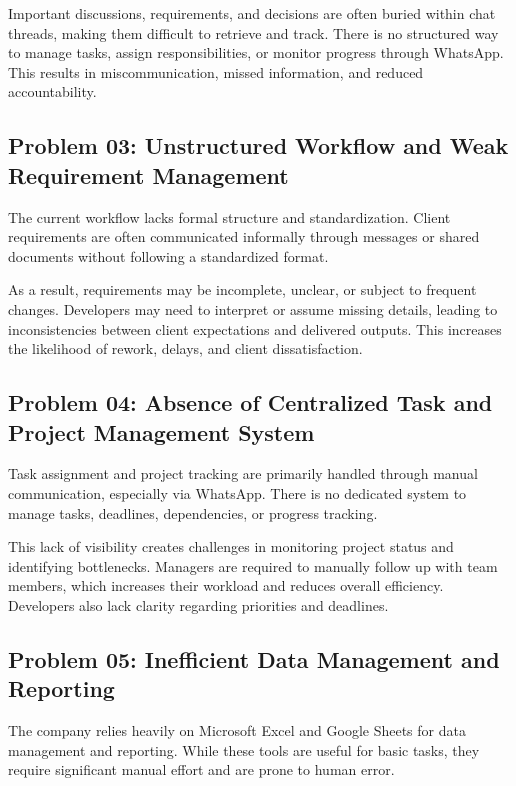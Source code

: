 \documentclass[12pt,a4paper]{report}
\begin{document}
Important discussions, requirements, and decisions are often buried within chat threads, making them difficult to retrieve and track. There is no structured way to manage tasks, assign responsibilities, or monitor progress through WhatsApp. This results in miscommunication, missed information, and reduced accountability.

\subsection{Problem 03: Unstructured Workflow and Weak Requirement Management}

The current workflow lacks formal structure and standardization. Client requirements are often communicated informally through messages or shared documents without following a standardized format.

As a result, requirements may be incomplete, unclear, or subject to frequent changes. Developers may need to interpret or assume missing details, leading to inconsistencies between client expectations and delivered outputs. This increases the likelihood of rework, delays, and client dissatisfaction.

\subsection{Problem 04: Absence of Centralized Task and Project Management System}

Task assignment and project tracking are primarily handled through manual communication, especially via WhatsApp. There is no dedicated system to manage tasks, deadlines, dependencies, or progress tracking.

This lack of visibility creates challenges in monitoring project status and identifying bottlenecks. Managers are required to manually follow up with team members, which increases their workload and reduces overall efficiency. Developers also lack clarity regarding priorities and deadlines.

\subsection{Problem 05: Inefficient Data Management and Reporting}

The company relies heavily on Microsoft Excel and Google Sheets for data management and reporting. While these tools are useful for basic tasks, they require significant manual effort and are prone to human error.
\end{document}
